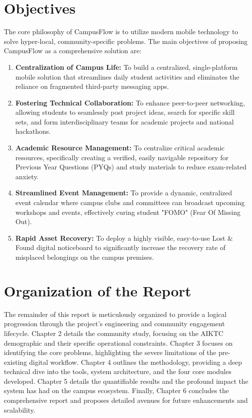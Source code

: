\section{Objectives}
The core philosophy of CampusFlow is to utilize modern mobile technology to solve hyper-local, community-specific problems. The main objectives of proposing CampusFlow as a comprehensive solution are:
\begin{enumerate}
    \item \textbf{Centralization of Campus Life:} To build a centralized, single-platform mobile solution that streamlines daily student activities and eliminates the reliance on fragmented third-party messaging apps.
    \item \textbf{Fostering Technical Collaboration:} To enhance peer-to-peer networking, allowing students to seamlessly post project ideas, search for specific skill sets, and form interdisciplinary teams for academic projects and national hackathons.
    \item \textbf{Academic Resource Management:} To centralize critical academic resources, specifically creating a verified, easily navigable repository for Previous Year Questions (PYQs) and study materials to reduce exam-related anxiety.
    \item \textbf{Streamlined Event Management:} To provide a dynamic, centralized event calendar where campus clubs and committees can broadcast upcoming workshops and events, effectively curing student "FOMO" (Fear Of Missing Out).
    \item \textbf{Rapid Asset Recovery:} To deploy a highly visible, easy-to-use Lost \& Found digital noticeboard to significantly increase the recovery rate of misplaced belongings on the campus premises.
\end{enumerate}

\section{Organization of the Report}
The remainder of this report is meticulously organized to provide a logical progression through the project's engineering and community engagement lifecycle. Chapter 2 details the community study, focusing on the AIKTC demographic and their specific operational constraints. Chapter 3 focuses on identifying the core problems, highlighting the severe limitations of the pre-existing digital workflow. Chapter 4 outlines the methodology, providing a deep technical dive into the tools, system architecture, and the four core modules developed. Chapter 5 details the quantifiable results and the profound impact the system has had on the campus ecosystem. Finally, Chapter 6 concludes the comprehensive report and proposes detailed avenues for future enhancements and scalability.